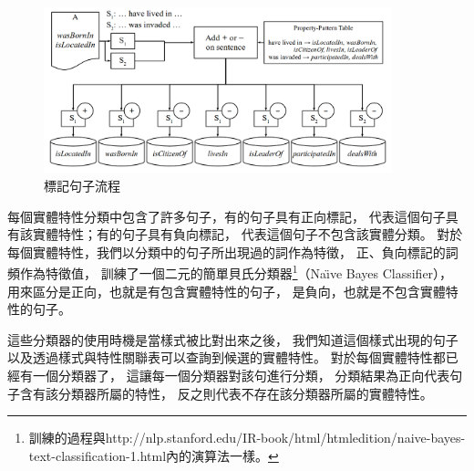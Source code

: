 \begin{figure}
    \centering
    \includegraphics[width=0.9\textwidth]{images/03-tagging}
    \caption{標記句子流程}
    \label{i:tagging}
\end{figure}

每個實體特性分類中包含了許多句子，有的句子具有正向標記，
代表這個句子具有該實體特性；有的句子具有負向標記，
代表這個句子不包含該實體分類。
對於每個實體特性，我們以分類中的句子所出現過的詞作為特徵，
正、負向標記的詞頻作為特徵值，
訓練了一個二元的簡單貝氏分類器\footnote{訓練的過程與http://nlp.stanford.edu/IR-book/html/htmledition/naive-bayes-text-classification-1.html內的演算法一樣。}（Na\"{\i}ve Bayes Classifier），
用來區分是正向，也就是有包含實體特性的句子，
是負向，也就是不包含實體特性的句子。

這些分類器的使用時機是當樣式被比對出來之後，
我們知道這個樣式出現的句子以及透過樣式與特性關聯表可以查詢到候選的實體特性。
對於每個實體特性都已經有一個分類器了，
這讓每一個分類器對該句進行分類，
分類結果為正向代表句子含有該分類器所屬的特性，
反之則代表不存在該分類器所屬的實體特性。


